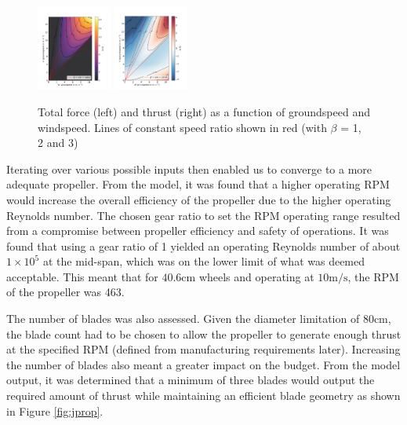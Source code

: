 \begin{figure}[!htbp]
    \centering
    \includegraphics[width = 0.22\textwidth]{images/part6/naca6412-8a-78-10-5-3-470-6.pdf}
    \includegraphics[width = 0.22\textwidth]{images/part6/naca6412-8a-78-10-5-3-470-6__total.pdf}
    
    \caption{Total force (left) and thrust (right) as a function of groundspeed and windspeed. Lines of constant speed ratio shown in red (with $\beta$ = 1, 2 and 3)}

    \label{fig:pythonresults}
\end{figure}

Iterating over various possible inputs then enabled us to converge to a more adequate propeller. From the model, it was found that a higher operating RPM would increase the overall efficiency of the propeller due to the higher operating Reynolds number. The chosen gear ratio to set the RPM operating range resulted from a compromise between propeller efficiency and safety of operations. It was found that using a gear ratio of 1 yielded an operating Reynolds number of about $1\times10^5$ at the mid-span, which was on the lower limit of what was deemed acceptable. This meant that for $40.6 \mathrm{cm}$ wheels and operating at $10 \mathrm{m/s}$, the RPM of the propeller was 463. 

The number of blades was also assessed. Given the diameter limitation of 80cm, the blade count had to be chosen to allow the propeller to generate enough thrust at the specified RPM (defined from manufacturing requirements later). Increasing the number of blades also meant a greater impact on the budget. From the model output, it was determined that a minimum of three blades would output the required amount of thrust while maintaining an efficient blade geometry as shown in Figure \ref{fig:jprop}.

